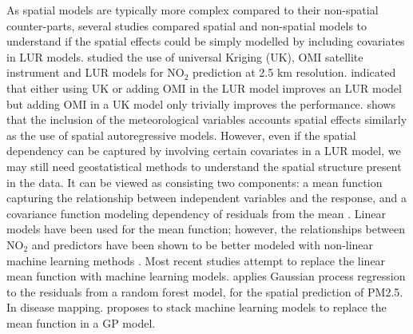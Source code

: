\documentclass{article}
\begin{document}
As spatial models are typically more complex compared to their non-spatial counter-parts, several studies compared spatial and non-spatial models to understand if the spatial effects could be simply modelled by including covariates in LUR models. \cite{young2016satellite} studied the use of universal Kriging (UK), OMI satellite instrument \citep{OMI} and LUR models for NO$_2$ prediction at 2.5 km resolution. \cite{young2016satellite} indicated that either using UK or adding OMI in the LUR model improves an LUR model but adding OMI in a UK model only trivially improves the performance. \cite{BERTAZZON20159} shows that the inclusion of the meteorological variables accounts spatial effects similarly as the use of spatial autoregressive models. However, even if the spatial dependency can be captured by involving certain covariates in a LUR model, we may still need geostatistical methods to understand the spatial structure present in the data. It can be viewed as consisting two components: a mean function capturing the relationship between independent variables and the response, and a covariance function modeling dependency of residuals from the mean \citep{stackinla}. Linear models have been used for the mean function; however, the relationships between NO$_2$ and predictors have been shown to be better modeled with non-linear machine learning methods \citep{luglobal}. Most recent studies attempt to replace the linear mean function with machine learning models. \cite{liu2020integrate} applies Gaussian process regression to the residuals from a random forest model, for the spatial prediction of PM2.5. In disease mapping. \cite{stackinla} proposes to stack machine learning models to replace the mean function in a GP model.   
\end{document}

